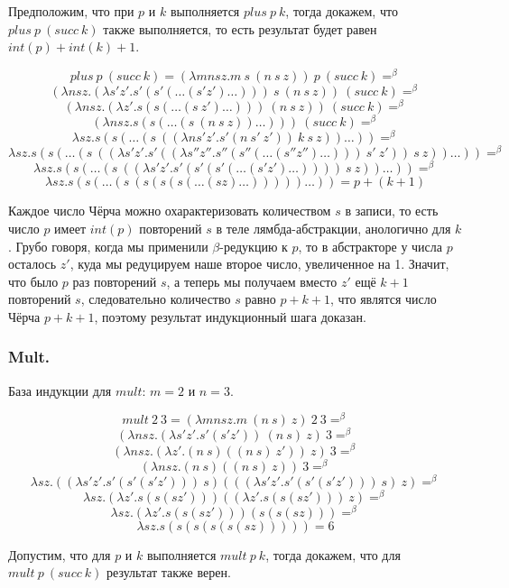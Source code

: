 \documentclass[a4paper,12pt]{article}
\theoremstyle{plain} %
\theoremstyle{definition} %
\theoremstyle{remark} %
\begin{document}
Предположим, что при $p$ и $k$ выполняется  $plus \ p \ k$, тогда докажем, что $plus \ p \ (succ \ k)$ также выполняется, то есть результат будет равен $int(p) + int(k) + 1$. 

$$plus \ p \ (succ \ k) = (\lambda m n s z. m \ s \ (n \ s \ z)) \ p \ (succ \ k) =^{\beta}$$
$$(\lambda n s z. (\lambda s'z'. s'(s'(\dots(s'z')\dots))) \ s \ (n \ s \ z)) \ (succ \ k) =^{\beta}$$
$$(\lambda n s z. (\lambda z'. s(s(\dots(s \ z')\dots))) \ (n \ s \ z)) \ (succ \ k) =^{\beta}$$
$$(\lambda n s z. s(s(\dots(s \ (n \ s \ z))\dots))) \ (succ \ k) =^{\beta}$$
$$\lambda s z. s(s(\dots(s \ ((\lambda ns'z'. s'(n \ s' \ z')) \ k \ s \ z))\dots)) =^{\beta}$$
$$\lambda s z. s(s(\dots(s \ ((\lambda s'z'. s'((\lambda s''z''. s''(s''(\dots(s''z'')\dots))) \ s' \ z')) \ s \ z))\dots)) =^{\beta}$$
$$\lambda s z. s(s(\dots(s \ ((\lambda s'z'. s'(s'(s'(\dots(s'z')\dots)))) \ s \ z))\dots)) =^{\beta}$$
$$\lambda s z. s(s(\dots(s \ (s(s(s(\dots(sz)\dots)))))\dots)) = p + (k + 1)$$

Каждое число Чёрча можно охарактеризовать количеством $s$ в записи, то есть число $p$ имеет $int(p)$ повторений $s$ в теле лямбда-абстракции, анологично для $k$. Грубо говоря, когда мы применили $\beta$-редукцию к $p$, то в абстракторе у числа $p$ осталось $z'$, куда мы редуцируем наше второе число, увеличенное на 1. Значит, что было $p$ раз повторений $s$, а теперь мы получаем вместо $z'$ ещё $k+1$ повторений $s$, следовательно количество $s$ равно $p+k+1$, что являтся число Чёрча $p + k + 1$, поэтому результат индукционный шага доказан.    

\subsubsection{Mult.}

База индукции для $mult$: $m = 2$ и $n = 3$.

$$mult \ 2 \ 3 = (\lambda m n s z. m \ (n \ s) \ z) \ 2 \ 3 =^{\beta}$$
$$(\lambda n s z. (\lambda s'z'. s'(s'z')) \ (n \ s) \ z) \ 3 =^{\beta}$$
$$(\lambda n s z. (\lambda z'. (n \ s)((n \ s) \ z')) \ z) \ 3 =^{\beta}$$
$$(\lambda n s z. (n \ s)((n \ s) \ z)) \ 3 =^{\beta}$$
$$\lambda s z. ((\lambda s'z'.s'(s'(s'z'))) \ s)(((\lambda s'z'.s'(s'(s'z'))) \ s) \ z) =^{\beta}$$
$$\lambda s z. (\lambda z'.s(s(sz')))((\lambda z'.s(s(sz'))) \ z) =^{\beta}$$
$$\lambda s z. (\lambda z'.s(s(sz')))(s(s(sz))) =^{\beta}$$
$$\lambda s z. s(s(s(s(s(sz))))) = 6$$

Допустим, что для $p$ и $k$ выполняется $mult \ p \ k$, тогда докажем, что для $mult \ p \ (succ \ k)$ результат также верен.
\end{document}
